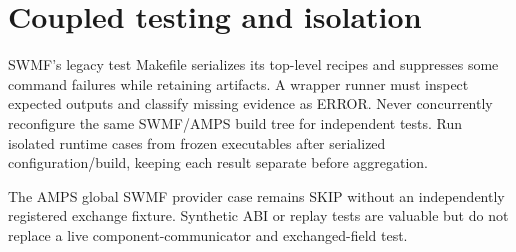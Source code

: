 \section{Coupled testing and isolation}
SWMF's legacy test Makefile serializes its top-level recipes and suppresses
some command failures while retaining  artifacts. A wrapper runner
must inspect expected outputs and classify missing evidence as ERROR.
Never concurrently reconfigure the same SWMF/AMPS build tree for independent
tests. Run isolated runtime cases from frozen executables after serialized
configuration/build, keeping each result separate before aggregation.

The AMPS global SWMF provider case remains SKIP without an independently
registered exchange fixture. Synthetic ABI or replay tests are valuable but
do not replace a live component-communicator and exchanged-field test.
